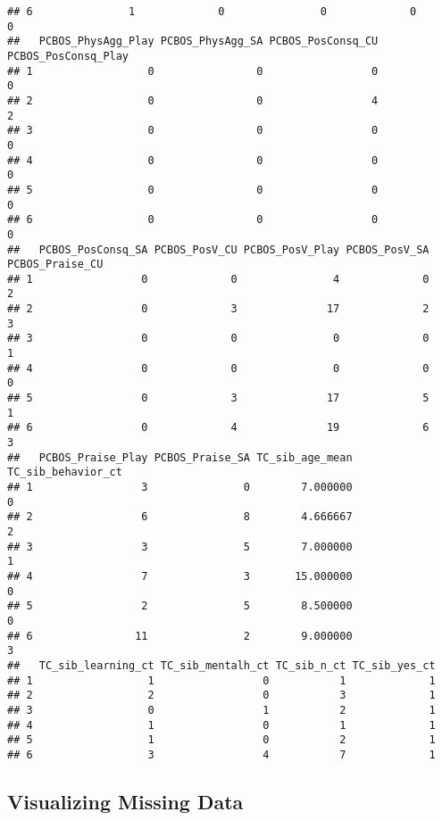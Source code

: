 \documentclass[
]{article}
\begin{document}
\begin{verbatim}
## 6               1             0               0             0                0
##   PCBOS_PhysAgg_Play PCBOS_PhysAgg_SA PCBOS_PosConsq_CU PCBOS_PosConsq_Play
## 1                  0                0                 0                   0
## 2                  0                0                 4                   2
## 3                  0                0                 0                   0
## 4                  0                0                 0                   0
## 5                  0                0                 0                   0
## 6                  0                0                 0                   0
##   PCBOS_PosConsq_SA PCBOS_PosV_CU PCBOS_PosV_Play PCBOS_PosV_SA PCBOS_Praise_CU
## 1                 0             0               4             0               2
## 2                 0             3              17             2               3
## 3                 0             0               0             0               1
## 4                 0             0               0             0               0
## 5                 0             3              17             5               1
## 6                 0             4              19             6               3
##   PCBOS_Praise_Play PCBOS_Praise_SA TC_sib_age_mean TC_sib_behavior_ct
## 1                 3               0        7.000000                  0
## 2                 6               8        4.666667                  2
## 3                 3               5        7.000000                  1
## 4                 7               3       15.000000                  0
## 5                 2               5        8.500000                  0
## 6                11               2        9.000000                  3
##   TC_sib_learning_ct TC_sib_mentalh_ct TC_sib_n_ct TC_sib_yes_ct
## 1                  1                 0           1             1
## 2                  2                 0           3             1
## 3                  0                 1           2             1
## 4                  1                 0           1             1
## 5                  1                 0           2             1
## 6                  3                 4           7             1
\end{verbatim}

\hypertarget{visualizing-missing-data}{%
\subsection{Visualizing Missing Data}\label{visualizing-missing-data}}
\end{document}
